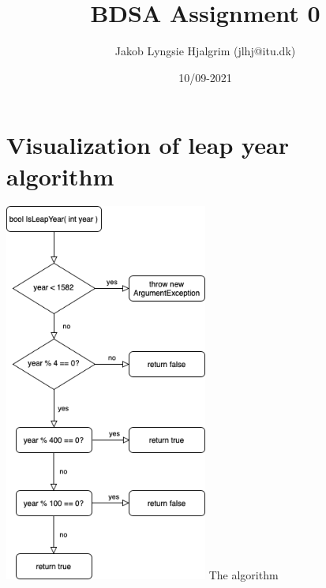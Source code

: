 \documentclass{article}
\title{BDSA Assignment 0}
\author{Jakob Lyngsie Hjalgrim (jlhj@itu.dk)}
\date{10/09-2021}
\begin{document}
\maketitle

\section{Visualization of leap year algorithm}
\includegraphics[width=0.5\textwidth]{leapyear_flowchart.png}
The algorithm
\end{document}
